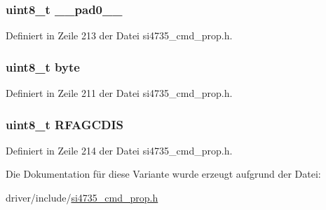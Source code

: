 \subsubsection[{\+\_\+\+\_\+pad0\+\_\+\+\_\+}]{\setlength{\rightskip}{0pt plus 5cm}uint8\+\_\+t \+\_\+\+\_\+pad0\+\_\+\+\_\+}\label{unionfm__agc__override__arg1_a8b4eebe79ded0459acec2f4950102ba3}


Definiert in Zeile 213 der Datei si4735\+\_\+cmd\+\_\+prop.\+h.

\hypertarget{unionfm__agc__override__arg1_a96f44d20f1dbf1c8785a7bc99a46164c}{}
\subsubsection[{byte}]{\setlength{\rightskip}{0pt plus 5cm}uint8\+\_\+t byte}\label{unionfm__agc__override__arg1_a96f44d20f1dbf1c8785a7bc99a46164c}


Definiert in Zeile 211 der Datei si4735\+\_\+cmd\+\_\+prop.\+h.

\hypertarget{unionfm__agc__override__arg1_a08f693cbe8c1321a038234eb53d365b9}{}
\subsubsection[{R\+F\+A\+G\+C\+D\+I\+S}]{\setlength{\rightskip}{0pt plus 5cm}uint8\+\_\+t R\+F\+A\+G\+C\+D\+I\+S}\label{unionfm__agc__override__arg1_a08f693cbe8c1321a038234eb53d365b9}


Definiert in Zeile 214 der Datei si4735\+\_\+cmd\+\_\+prop.\+h.



Die Dokumentation für diese Variante wurde erzeugt aufgrund der Datei\+:\begin{DoxyCompactItemize}
\item 
driver/include/\hyperlink{si4735__cmd__prop_8h}{si4735\+\_\+cmd\+\_\+prop.\+h}\end{DoxyCompactItemize}
